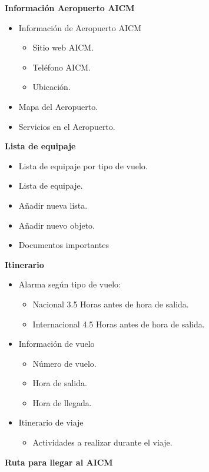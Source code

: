\textbf{Información Aeropuerto AICM}

\begin{itemize}
	\item Información de Aeropuerto AICM
	\begin{itemize}
		 \item Sitio web AICM.
		\item Teléfono AICM.
		\item Ubicación.
	\end{itemize}
	\item Mapa del Aeropuerto.
	\item	Servicios en el Aeropuerto.
\end{itemize}

\textbf{Lista de equipaje}

\begin{itemize}
	\item 	Lista de equipaje por tipo de vuelo.
	\item Lista de equipaje.
	\item Añadir nueva lista.
	\item Añadir nuevo objeto.
	\item Documentos importantes
\end{itemize}
	
\textbf{Itinerario}

\begin{itemize}
	\item Alarma según tipo de vuelo:
	\begin{itemize}
		\item Nacional 3.5 Horas antes de hora de salida.
		\item Internacional 4.5 Horas antes de hora de salida.
	\end{itemize}
	\item Información de vuelo
	\begin{itemize}
		\item Número de vuelo.
		\item Hora de salida.
		\item Hora de llegada.
	\end{itemize}
	\item Itinerario de viaje
	\begin{itemize}
	 \item Actividades a realizar durante el viaje.
	\end{itemize}
\end{itemize}

\textbf{Ruta para llegar al AICM}

